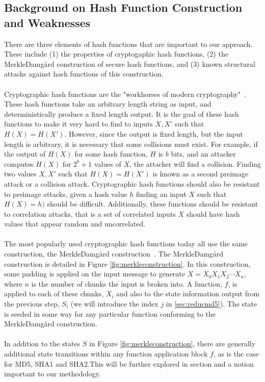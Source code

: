 \documentclass[letterpaper,twocolumn,10pt]{article}
\begin{document}
\subsection{Background on Hash Function Construction and Weaknesses} 
There are three elements of hash functions that are important to our approach. These include (1) the properties of cryptogaphic hash functions, (2) the Merkle{\textendash}Damg\r{a}rd construction of secure hash functions, and (3) known structural attacks against hash functions of this construction. 
\\
\\
Cryptographic hash functions are the "workhorses of modern cryptography"~\cite{bruce2004}. These hash functions take an arbitrary length string as input, and deterministically produce a fixed length output. It is the goal of these hash functions to make it very hard to find to inputs $X, X'$ such that $H(X) = H(X')$. However, since the output is fixed length, but the input length is arbitrary, it is necessary that some collisions must exist. For example, if the output of $H(X)$ for some hash function, $H$ is $b$ bits, and an attacker computes $H(X)$ for $2^b + 1$ values of $X$, the attacker will find a collision. Finding two values $X, X'$ such that $H(X) = H(X')$ is known as a second preimage attack or a collision attack. Cryptographic hash functions should also be resistant to preimage attacks, given a hash value $h$ finding an input $X$ such that $H(X) = h)$ should be difficult. Additionally, these functions should be resistant to correlation attacks, that is a set of correlated inputs $X$ should have hash values that appear random and uncorrelated. 
\\
\\
The most popularly used cryptographic hash functions today all use the same construction, the Merkle{\textendash}Damg\r{a}rd construction~\cite{merkle1979secrecy, bruce2004}. The Merkle{\textendash}Damg\r{a}rd construction is detailed in Figure \ref{fig:merkleconstruction}. In this construction, some padding is applied on the input message to generate $X = X_0X_1X_2\cdots X_n$, where $n$ is the number of chunks the input is broken into. A function, $f$, is applied to each of these chunks, $X_i$ and also to the state information output from the previous step, $S_i$ (we will introduce the index $j$ in \ref{sec:reducmd5}). The state is seeded in some way for any particular function conforming to the Merkle{\textendash}Damg\r{a}rd construction. 
\\
\\
In addition to the states $S$ in Figure \ref{fig:merkleconstruction}, there are generally additional state transitions within any function application block $f$, as is the case for MD5, SHA1 and SHA2.This will be further explored in section \label{bbdef} and a notion important to our methodology. 
\end{document}
